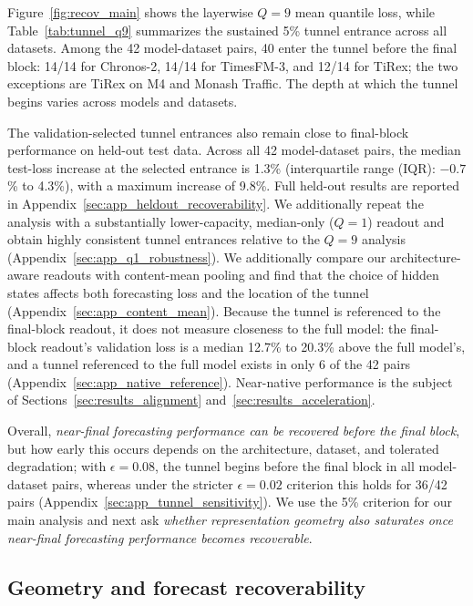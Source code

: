\documentclass{article} %
\begin{document}
Figure~\ref{fig:recov_main} shows the layerwise $Q=9$ mean quantile loss, while Table~\ref{tab:tunnel_q9} summarizes the sustained 5\% tunnel entrance across all datasets. Among the 42 model-dataset pairs, 40 enter the tunnel before the final block: 14/14 for Chronos-2, 14/14 for TimesFM-3, and 12/14 for TiRex; the two exceptions are TiRex on M4 and Monash Traffic. The depth at which the tunnel begins varies across models and datasets.

The validation-selected tunnel entrances also remain close to final-block performance on held-out test data. Across all 42 model-dataset pairs, the median test-loss increase at the selected entrance is 1.3\% (interquartile range (IQR): $-0.7$\% to 4.3\%), with a maximum increase of 9.8\%. Full held-out results are reported in Appendix~\ref{sec:app_heldout_recoverability}. We additionally repeat the analysis with a substantially lower-capacity, median-only ($Q=1$) readout and obtain highly consistent tunnel entrances relative to the $Q=9$ analysis (Appendix~\ref{sec:app_q1_robustness}). 
We additionally compare our architecture-aware readouts with content-mean pooling and find that the choice of hidden states affects both forecasting loss and the location of the tunnel (Appendix~\ref{sec:app_content_mean}).
Because the tunnel is referenced to the final-block readout, it does not measure closeness to the full model: the final-block readout's validation loss is a median 12.7\% to 20.3\% above the full model's, and a tunnel referenced to the full model exists in only 6 of the 42 pairs (Appendix~\ref{sec:app_native_reference}). Near-native performance is the subject of Sections~\ref{sec:results_alignment} and~\ref{sec:results_acceleration}.


Overall, \textit{near-final forecasting performance can be recovered before the final block}, but how early this occurs depends on the architecture, dataset, and tolerated degradation; with $\epsilon=0.08$, the tunnel begins before the final block in all model-dataset pairs, whereas under the stricter $\epsilon=0.02$ criterion this holds for 36/42 pairs (Appendix~\ref{sec:app_tunnel_sensitivity}). We use the 5\% criterion for our main analysis and next ask \textit{whether representation geometry also saturates once near-final forecasting performance becomes recoverable}. 

\subsection{Geometry and forecast recoverability}
\label{sec:results_geometry}
\end{document}
